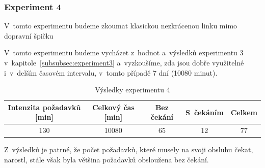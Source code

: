 \documentclass[a4paper]{article}
\begin{document}
            \subsubsection{Experiment 4}
            \label{subsubsec:experiment4}
                V~tomto experimentu budeme zkoumat klasickou nezkrácenou linku mimo dopravní špičku


                V~tomto experimentu budeme vycházet z~hodnot a~výsledků experimentu 3 v~kapitole~\ref{subsubsec:experiment3} a~vyzkoušíme,
                zda jsou dobře využitelné i~v~delším časovém intervalu, v~tomto případě 7 dní (10080 minut).

                \begin{table}[H]
                    \centering
                    \begin{tabular}{ | c | c | c | c | c | }
                        \hline
                        Intenzita požadavků [min] & Celkový čas [min] & Bez čekání & S~čekáním & Celkem \\
                        \hline
                        \hline
                        130 & 10080 & 65 & 12 & 77 \\
                        \hline
                    \end{tabular}
                    \caption{Výsledky experimentu 4}
                    \label{tab:experiment4}
                \end{table}

                Z~výsledků je patrné, že počet požadavků, které musely na svoji obsluhu čekat, narostl,
                stále však byla většina požadavků obsloužena bez čekání.
\end{document}
